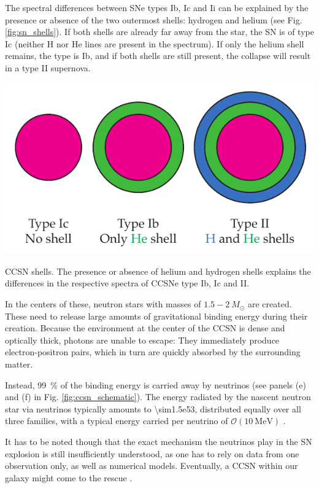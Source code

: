 \documentclass[
    a4paper, %
    fontsize=10pt, %
    twoside=false, %
    numbers=noenddot, %
    fontmethod=tex,
]{kaobook}
\begin{document}
The spectral differences between SNe types Ib, Ic and Ii can be explained by the presence or absence of the two outermost shells: hydrogen and helium (see Fig. \ref{fig:sn_shells}). If both shells are already far away from the star, the SN is of type Ic (neither H nor He lines are present in the spectrum). If only the helium shell remains, the type is Ib, and if both shells are still present, the collapse will result in a type II supernova.

\begin{marginfigure}
    \includegraphics{theory/sn_shells.pdf}
    \caption[CCSN shells]{CCSN shells. The presence or absence of helium and hydrogen shells explains the differences in the respective spectra of CCSNe type Ib, Ic and II.}
\end{marginfigure}

In the centers of these, neutron stars with masses of $1.5-2~M_\odot$ are created. These need to release large amounts of gravitational binding energy during their creation. Because the environment at the center of the CCSN is dense and optically thick, photons are unable to escape: They immediately produce electron-positron pairs, which in turn are quickly absorbed by the surrounding matter.

Instead, \SI{99}{\percent} of the binding energy is carried away by neutrinos (see panels (e) and (f) in Fig. \ref{fig:ccsn_schematic}). The energy radiated by the nascent neutron star via neutrinos typically amounts to \SI{\sim1.5e53}{\erg}, distributed equally over all three families, with a typical energy carried per neutrino of $\mathcal{O}(\SI{10}{\mega\eV})$ . 

It has to be noted though that the exact mechanism the neutrinos play in the SN explosion is still insufficiently understood, as one has to rely on data from one observation only, as well as numerical models. Eventually, a CCSN within our galaxy might come to the rescue .
\end{document}
